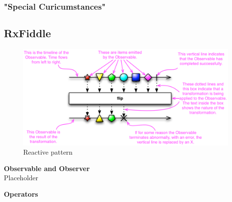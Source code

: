 		\subsubsection{"Special Curicumstances"}
	

	\subsection{RxFiddle}





\begin{figure}[!h]
	\centering
	\includegraphics[scale=0.5,trim=0 0 0 0]{gfx/rxjs-reactive-pattern2.png}
	\caption{Reactive pattern \protect\cite{ReactiveXobservable}}
	\label{fig:rxjs-reactive-pattern}
\end{figure}

\textbf{Observable and Observer}\\
Placeholder

\textbf{Operators}
\label{subsec:Operators}\\

